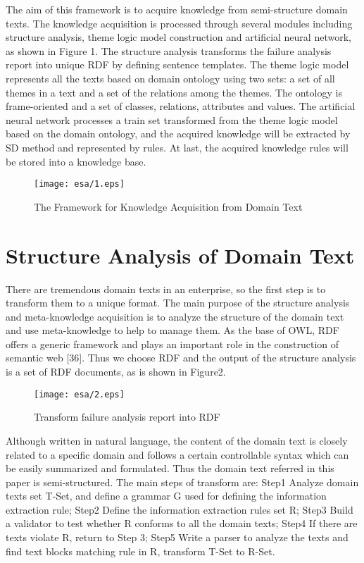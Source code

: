 \documentclass{elsarticle}
\begin{document}
The aim of this framework is to acquire knowledge from semi-structure
domain texts. The knowledge acquisition is processed through several
modules including structure analysis, theme logic model construction
and artificial neural network, as shown in Figure 1. The structure
analysis transforms the failure analysis report into unique RDF by
defining sentence templates. The theme logic model represents all the
texts based on domain ontology using two sets: a set of all themes in
a text and a set of the relations among the themes. The ontology is
frame-oriented and a set of classes, relations, attributes and
values. The artificial neural network processes a train set
transformed from the theme logic model based on the domain ontology,
and the acquired knowledge will be extracted by SD method and
represented by rules. At last, the acquired knowledge rules will be
stored into a knowledge base.
\begin{figure}[htp]
  \centering
  \texttt{[image: esa/1.eps]}

  \caption{The Framework for Knowledge Acquisition from Domain Text}
  \label{fig:1}
\end{figure}

\section{Structure Analysis of Domain Text 
}
\label{sec:struct-analys-doma}

There are tremendous domain texts in an enterprise, so the first step
is to transform them to a unique format. The main purpose of the
structure analysis and meta-knowledge acquisition is to analyze the
structure of the domain text and use meta-knowledge to help to manage
them. As the base of OWL, RDF offers a generic framework and plays an
important role in the construction of semantic web [36]. Thus we
choose RDF and the output of the structure analysis is a set of RDF
documents, as is shown in Figure2. 
\begin{figure}[htp]
  \centering
  \texttt{[image: esa/2.eps]}

  \caption{Transform failure analysis report into RDF}
  \label{fig:2}
\end{figure}
Although written in natural language, the content of the domain text is closely related to a specific domain and follows a certain controllable syntax which can be easily summarized and formulated. Thus the domain text referred in this paper is semi-structured. The main steps of transform are:
Step1 Analyze domain texts set T-Set, and define a grammar G used for defining the information extraction rule;
Step2 Define the information extraction rules set R;
Step3 Build a validator to test whether R conforms to all the domain texts;
Step4 If there are texts violate R, return to Step 3;
Step5 Write a parser to analyze the texts and find text blocks
matching rule in R, transform T-Set to R-Set.  
\end{document}
